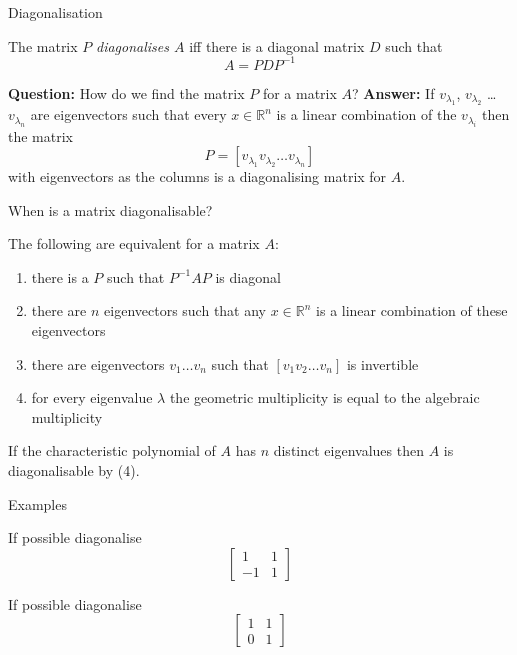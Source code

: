 \documentclass{beamer}
\begin{document}
\begin{frame}{Diagonalisation}
\begin{definition}
The matrix $P$ \emph{diagonalises $A$} iff there is a diagonal matrix $D$ such that
\begin{equation*}
A = PDP^{-1}
\end{equation*}
\end{definition}\vfill
{\bf Question:} How do we find the matrix $P$ for a matrix $A$?\vfill
{\bf Answer:} If $v_{\lambda_1}$, $v_{\lambda_2}$ \dots $v_{\lambda_n}$ are eigenvectors such that every $x\in \mathbb{R}^n$ is a linear combination of the $v_{\lambda_i}$ then the matrix
\begin{equation*}
P = \left[ v_{\lambda_1} v_{\lambda_2} \dots v_{\lambda_n}\right]
\end{equation*}
with eigenvectors as the columns is a diagonalising matrix for $A$.
\end{frame}

\begin{frame}{When is a matrix diagonalisable?}
\begin{theorem}
The following are equivalent for a matrix $A$:
\begin{enumerate}
	\item there is a $P$ such that $P^{-1}AP$ is diagonal
	\item there are $n$ eigenvectors such that any $x\in \mathbb{R}^n$ is a linear combination of these eigenvectors
	\item there are eigenvectors $v_1\dots v_n$ such that $\left[v_1 v_2\dots v_n \right]$ is invertible
	\item for every eigenvalue $\lambda$ the geometric multiplicity is equal to the algebraic multiplicity
\end{enumerate}
\end{theorem}

\begin{lemma}
If the characteristic polynomial of $A$ has $n$ distinct eigenvalues then $A$ is diagonalisable by (4).
\end{lemma}
\end{frame}

\begin{frame}{Examples}
\begin{example}
If possible diagonalise
\begin{equation*}
\left[
\begin{matrix}
1&1\\
-1&1
\end{matrix}
\right]
\end{equation*}
\end{example}
\begin{example}
If possible diagonalise
\begin{equation*}
\left[
\begin{matrix}
1&1\\
0&1
\end{matrix}
\right]
\end{equation*}
\end{example}
\end{frame}
\end{document}

